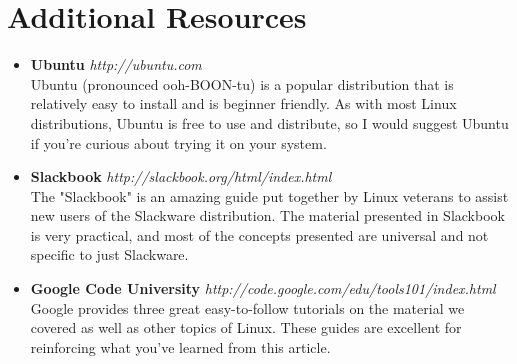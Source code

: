 \documentclass[11pt,oneside]{article}
\newenvironment{articleSectionN}[1]
{#1}
{}
\begin{document}
\section*{Additional Resources}
\begin{articleSectionN}
\begin{itemize}
\item{\textbf{Ubuntu} \quad \emph{http://ubuntu.com}\\
Ubuntu (pronounced ooh-BOON-tu) is a popular distribution that is relatively easy to install and is beginner friendly. As with most Linux distributions, Ubuntu is free to use and distribute, so I would suggest Ubuntu if you're curious about trying it on your system.}
\item{\textbf{Slackbook} \quad \emph{http://slackbook.org/html/index.html}\\
The "Slackbook" is an amazing guide put together by Linux veterans to assist new users of the Slackware distribution. The material presented in Slackbook is very practical, and most of the concepts presented are universal and not specific to just Slackware.}
\item{\textbf{Google Code University} \quad \emph{http://code.google.com/edu/tools101/index.html}\\
Google provides three great easy-to-follow tutorials on the material we covered as well as other topics of Linux. These guides are excellent for reinforcing what you've learned from this article.}
\end{itemize}
\end{articleSectionN}
\end{document}
